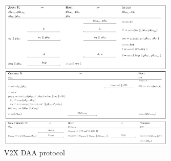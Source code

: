 \documentclass{ctexbeamer}
\begin{document}
\begin{frame}

    \begin{figure}[H]
        \centering 
        \includegraphics[width=0.75\textwidth]{pic/v2x.daa.crypto.png} 
        \caption{V2X DAA protocol} 
        \label{fig.v2x.daa.crypto}
    \end{figure}

\end{frame}
\end{document}
